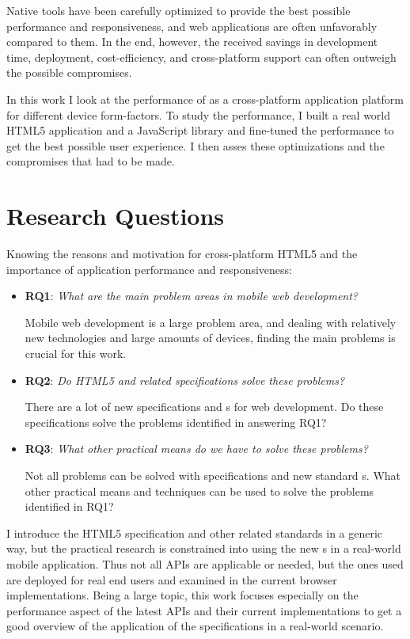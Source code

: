 Native tools have been carefully optimized to provide the best
possible performance and responsiveness, and web applications are
often unfavorably compared to them. In the end, however, the received
savings in development time, deployment, cost-efficiency, and
cross-platform support can often outweigh the possible
compromises. \cite{charland2011mobile, fling2009mobile}

In this work I look at the performance of  as a
cross-platform application platform for different device
form-factors. To study the performance, I built a real world HTML5
application and a JavaScript library and fine-tuned the performance to
get the best possible user experience. I then asses these
optimizations and the compromises that had to be made.

\section{Research Questions}
\label{section:research-questions}

Knowing the reasons and motivation for cross-platform HTML5 and the
importance of application performance and responsiveness:

\begin{itemize}
\item \textbf{RQ1}: \textit{What are the main problem areas in mobile
  web development?}

  Mobile web development is a large problem area, and dealing with
  relatively new technologies and large amounts of devices, finding
  the main problems is crucial for this work.

\item \textbf{RQ2}: \textit{Do HTML5 and related specifications solve
  these problems?}

  There are a lot of new specifications and s for web
  development. Do these specifications solve the problems identified
  in answering RQ1?

\item \textbf{RQ3}: \textit{What other practical means do we have to
  solve these problems?}

  Not all problems can be solved with specifications and new standard
  s. What other practical means and techniques can be used
  to solve the problems identified in RQ1?

\end{itemize}

I introduce the HTML5 specification and other related standards in a
generic way, but the practical research is constrained into using the
new s in a real-world mobile application. Thus not all APIs
are applicable or needed, but the ones used are deployed for real end
users and examined in the current browser implementations. Being a
large topic, this work focuses especially on the performance aspect of
the latest APIs and their current implementations to get a good
overview of the application of the specifications in a real-world
scenario.

